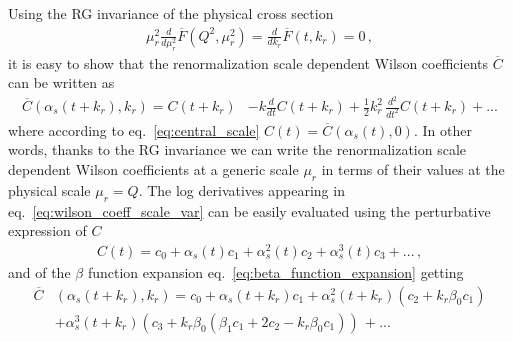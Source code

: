 Using the RG invariance of the physical cross section
\begin{align}
    \label{eq:RG_invariance}
    \mu_r^2\frac{d}{d\mu_r^2}\overline{F}\left(Q^2,\mu_r^2\right) = \frac{d}{dk_r}\overline{F}\left(t,k_r\right)=0\,,
\end{align}
it is easy to show that
the renormalization scale dependent Wilson coefficients $\overline{C}$ can be written as
\begin{align}
    \label{eq:wilson_coeff_scale_var}
    \overline{C}\left(\alpha_s\left(t+k_r\right),k_r\right) =
    C\left(t+k_r\right) &-  k\frac{d}{dt}C\left(t+k_r\right) 
    + \frac{1}{2} k_r^2\, \frac{d^2}{dt^2}C\left(t+k_r\right) + ...
\end{align}
where according to eq.~\eqref{eq:central_scale} $C\left(t\right) = \overline{C}\left(\alpha_s\left(t\right),0\right)$.
In other words, thanks to the RG invariance we can write the renormalization scale dependent Wilson coefficients
at a generic scale $\mu_r$ in terms of their values at the physical scale $\mu_r=Q$.
The log derivatives appearing in eq.~\eqref{eq:wilson_coeff_scale_var} can be easily evaluated using the 
perturbative expression of $C$ 
\begin{align}
    C\left(t\right) = 
    c_0 + \alpha_s\left(t\right)c_1 + \alpha_s^2\left(t\right)c_2 + \alpha_s^3\left(t\right)c_3 + ...\,,
\end{align}
and of the $\beta$ function expansion eq.~\eqref{eq:beta_function_expansion} getting
\begin{align}
    \label{eq:scale_varied_wilson_coeff}
    \overline{C}&\left(\alpha_s\left(t+k_r\right),k_r\right) = c_0 
    + \alpha_s\left(t+k_r\right)c_1 + \alpha_s^2\left(t+k_r\right)\left(c_2 + k_r\beta_0 c_1\right) \nonumber \\
    &+ \alpha_s^3\left(t+k_r\right)\left(c_3 + k_r\beta_0\left(\beta_1c_1 +2c_2 - k_r\beta_0 c_1\right)\right)\, + ...
\end{align} 

